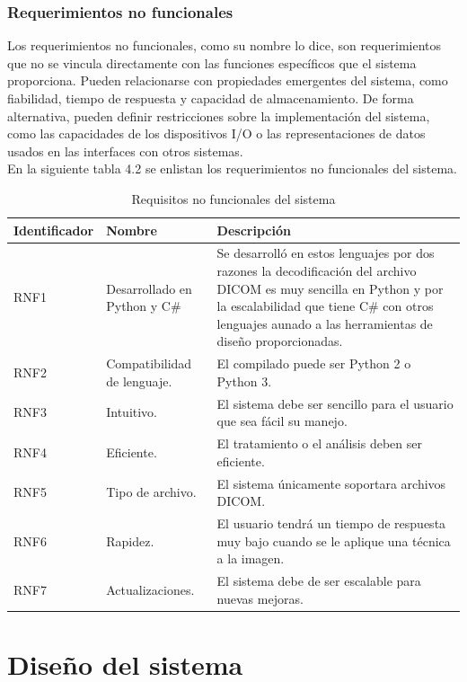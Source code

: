 \documentclass[12pt]{report}
\begin{document}
\subsection{Requerimientos no funcionales}
Los requerimientos no funcionales, como su nombre lo dice, son requerimientos que no se vincula directamente con las funciones específicos que el sistema proporciona. Pueden relacionarse con propiedades emergentes del sistema, como fiabilidad, tiempo de respuesta y capacidad de almacenamiento. De forma alternativa, pueden definir restricciones sobre la implementación del sistema, como las capacidades de los dispositivos I/O o las representaciones de datos
usados en las interfaces con otros sistemas. \cite{isRF} \\

En la siguiente tabla 4.2 se enlistan los requerimientos no funcionales del sistema.

\begin{table}[H]
\begin{center}
\begin{tabular}{|p{23mm}|p{35mm}|p{75mm}|}
\hline
 Identificador & Nombre & Descripción \\
\hline \hline 
RNF1 & Desarrollado en Python y C\# & Se desarrolló en estos lenguajes por dos razones la decodificación del archivo DICOM es muy sencilla en Python y por la escalabilidad que tiene C\# con otros lenguajes aunado a las herramientas de diseño proporcionadas.\\
\hline
RNF2 & Compatibilidad de lenguaje. & El compilado puede ser Python 2 o Python 3.\\
\hline
RNF3 & Intuitivo. & El sistema debe ser sencillo para el usuario que sea fácil su manejo.\\
\hline
RNF4 & Eficiente. & El tratamiento o el análisis deben ser eficiente.\\
\hline
RNF5 & Tipo de archivo. & El sistema únicamente soportara archivos DICOM.\\
\hline
RNF6 & Rapidez. & El usuario tendrá un tiempo de respuesta muy bajo cuando se le aplique una técnica a la imagen.\\
\hline
RNF7 & Actualizaciones. & El sistema debe de ser escalable para nuevas mejoras.\\
\hline
\end{tabular}
\caption{Requisitos no funcionales del sistema}
\end{center}
\end{table}

\chapter{Diseño del sistema}
\end{document}
